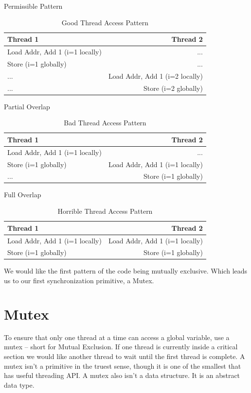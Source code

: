 Permissible Pattern
\begin{table}[h]
  \centering
\caption{Good Thread Access Pattern}
\begin{tabular}{ l | r }
  Thread 1 & Thread 2 \\ \hline
  Load Addr, Add 1 (i=1 locally) & ...  \\
  Store (i=1 globally) & ...  \\
  ... & Load Addr, Add 1 (i=2 locally)  \\
  ... & Store (i=2 globally)  \\
\end{tabular}
\end{table}
Partial Overlap

\begin{table}[h]
  \centering
\caption{Bad Thread Access Pattern}
\begin{tabular}{ l | r }
Thread 1 & Thread 2 \\ \hline
Load Addr, Add 1 (i=1 locally) & ... \\
Store (i=1 globally) & Load Addr, Add 1 (i=1 locally) \\
... & Store (i=1 globally) \\
\end{tabular}
\end{table}

Full Overlap
\begin{table}[h]
  \centering
\caption{Horrible Thread Access Pattern}
\begin{tabular}{ l | r }
Thread 1 & Thread 2 \\ \hline
Load Addr, Add 1 (i=1 locally) & Load Addr, Add 1 (i=1 locally) \\
Store (i=1 globally) & Store (i=1 globally) \\
\end{tabular}
\end{table}
We would like the first pattern of the code being mutually exclusive.
Which leads us to our first synchronization primitive, a Mutex.

\section{Mutex}

To ensure that only one thread at a time can access a global variable, use a mutex -- short for Mutual Exclusion.
If one thread is currently inside a critical section we would like another thread to wait until the first thread is complete.
A mutex isn't a primitive in the truest sense, though it is one of the smallest that has useful threading API.
A mutex also isn't a data structure.
It is an abstract data type.

